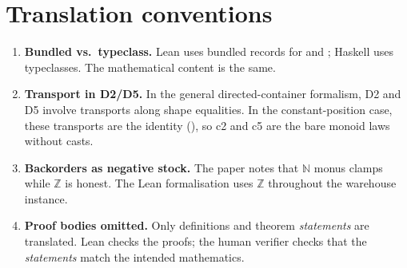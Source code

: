 \documentclass[11pt,a4paper]{article}
\begin{document}
\section{Translation conventions}

\begin{enumerate}
\item \textbf{Bundled vs.\ typeclass.}  Lean uses bundled records for
   and ; Haskell uses typeclasses.  The
  mathematical content is the same.

\item \textbf{Transport in D2/D5.}  In the general directed-container
  formalism, D2 and D5 involve transports along shape equalities.  In the
  constant-position case, these transports are the identity (),
  so c2 and c5 are the bare monoid laws without casts.

\item \textbf{Backorders as negative stock.}  The paper notes that $\mathbb{N}$
  monus clamps while $\mathbb{Z}$ is honest.  The Lean formalisation uses
  $\mathbb{Z}$ throughout the warehouse instance.

\item \textbf{Proof bodies omitted.}  Only definitions and theorem
  \emph{statements} are translated.  Lean checks the proofs; the human
  verifier checks that the \emph{statements} match the intended mathematics.
\end{enumerate}
\end{document}
